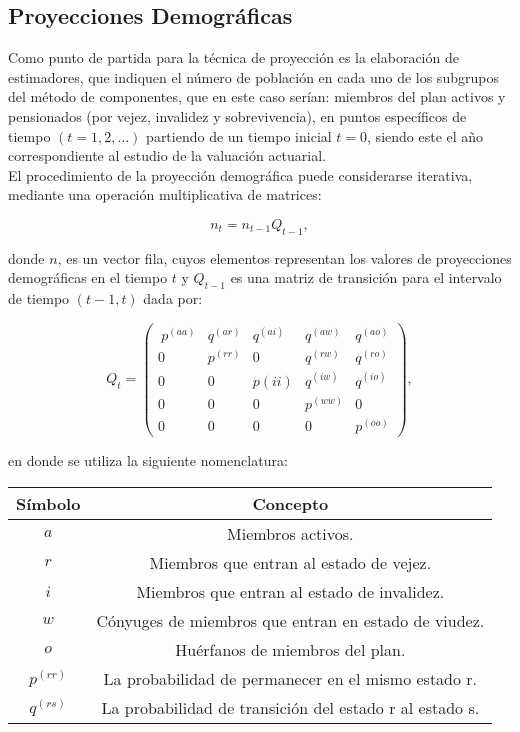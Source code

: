 \documentclass[12pt,letterpaper,titlepage]{article}
\begin{document}
{\subsection{Proyecciones Demográficas}

Como punto de partida para la técnica de proyección es la elaboración de estimadores, que indiquen el número de población en cada uno de los subgrupos del método de componentes, que en este caso serían: miembros del plan activos y pensionados (por vejez, invalidez y sobrevivencia), en puntos específicos de tiempo $(t=1, 2,...)$ partiendo de un tiempo inicial $t=0$, siendo este el año correspondiente al estudio de la valuación actuarial.\\

El procedimiento de la proyección demográfica puede considerarse iterativa, mediante una operación multiplicativa de matrices: 

\[ n_{t}=n_{t-1}Q_{t-1},\]

donde $n$, es un vector fila, cuyos elementos representan los valores de proyecciones demográficas en el tiempo $t$ y $Q_{t-1}$ es una matriz de transición para el intervalo de tiempo $(t-1,t)$ dada por:

\[ Q_{t}= \left( \begin{array}{ccccc}\ p^{(aa)} & q^{(ar)} & q^{(ai)} & q^{(aw)} & q^{(ao)}\\
0 & p^{(rr)} & 0 & q^{(rw)} & q^{(ro)}\\
0 & 0 & p(ii) & q^{(iw)} & q^{(io)}\\
0 & 0 & 0 & p^{(ww)} & 0\\
0 & 0 & 0 & 0  & p^{(oo)}\end{array}\right) ,\]

en donde se utiliza la siguiente nomenclatura:

\begin{center}
	\begin{tabular}{|c||c|}
	\hline 
	\rule[-1ex]{0pt}{2.5ex} Símbolo & Concepto \\ 
	\hline 
	\hline 
	\rule[-1ex]{0pt}{2.5ex} $a$ & Miembros activos. \\ 
	\hline 
	\rule[-1ex]{0pt}{2.5ex} $r$ & Miembros que entran al estado de vejez. \\ 
	\hline 
	\rule[-1ex]{0pt}{2.5ex} $i$ & Miembros  que entran al estado de invalidez. \\ 
	\hline 
	\rule[-1ex]{0pt}{2.5ex} $w$ & Cónyuges de miembros que entran en estado de viudez. \\ 
	\hline 
	\rule[-1ex]{0pt}{2.5ex} $o$ & Huérfanos de miembros del plan. \\ 
	\hline 
	\rule[-1ex]{0pt}{2.5ex} $p^{(rr)}$ & La probabilidad de permanecer en el mismo estado r. \\ 
	\hline 
	\rule[-1ex]{0pt}{2.5ex} $q^{(rs)}$ & La probabilidad de transición del estado r al estado s. \\ 
	\hline 
\end{tabular}
\end{center} 

}
\end{document}
